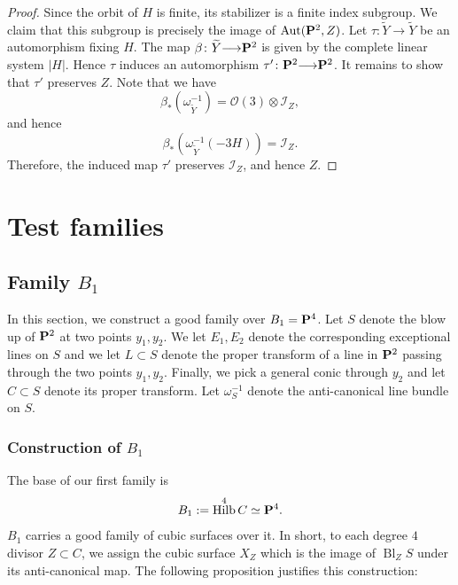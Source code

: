 \documentclass[12pt,reqno]{amsart}
\DeclareMathOperator{\Bl}{Bl}
\DeclareMathOperator{\Hilb}{Hilb}
\renewcommand{\to}{{\longrightarrow}}
\numberwithin{equation}{section}
\renewcommand{\O}{\mathcal O}
\begin{document}
\begin{proof}
  Since the orbit of $H$ is finite, its stabilizer is a finite index subgroup.
  We claim that this subgroup is precisely the image of $\Aut(\P^2, Z)$.
  Let $\tau \colon \widetilde Y \to \widetilde Y$ be an automorphism fixing $H$.
  The map $\beta \colon \widetilde Y \to \P^2$ is given by the complete linear system $|H|$.
  Hence $\tau$ induces an automorphism $\tau' \colon \P^2 \to \P^2$.
  It remains to show that $\tau'$ preserves $Z$.
  Note that we have
  \[ \beta_* \left(\omega_{\widetilde Y}^{-1}\right) = \O(3) \otimes \mathcal I_Z,\]
  and hence
  \[ \beta_* \left( \omega_{\widetilde Y}^{-1} (-3H) \right) = \mathcal I_Z.\]
  Therefore, the induced map $\tau'$ preserves $\mathcal I_Z$, and hence $Z$.
\end{proof}



\section{Test families}\label{sec:testfamilies}
\subsection{Family $B_1$}
\label{sec:first-test-family}

In this section, we construct a good family over $B_{1} = \P^{4}$.
Let $S$ denote the blow up of $\P^{2}$ at two points $y_1,y_2$. We let
$E_{1}, E_{2}$ denote the corresponding exceptional lines on $S$ and
we let $L \subset S$ denote the proper transform of a line in $\P^2$
passing through the two points $y_1,y_2$. Finally, we pick a general
conic through $y_{2}$ and let $C \subset S$ denote its proper
transform. Let $\omega_{S}^{-1}$ denote the anti-canonical line bundle
on $S$.  

\subsubsection{Construction of $B_1$}
\label{sec:construction-b_1}


The base of our first family is
\begin{align}
  \label{eq:B1}
  B_1 := \Hilb^{4}C \simeq \P^{4}.
\end{align}
$B_1$ carries a good family of cubic surfaces over it.  In short, to
each degree $4$ divisor $Z \subset C$, we assign the cubic surface
$X_{Z}$ which is the image of $\Bl_{Z}S$ under its anti-canonical
map. The following proposition justifies this construction:
\end{document}
